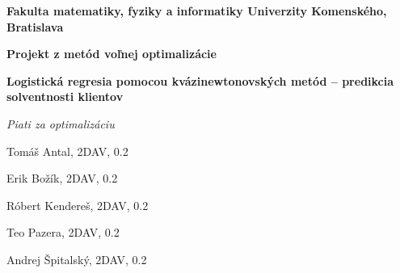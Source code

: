 \documentclass[12pt,oneside,a4paper,slovak]{article}
\begin{document}
	\setcounter{section}{-1}
	\begin{titlepage}
		\large
		
		\begin{center}
			\textbf{Fakulta matematiky, fyziky a informatiky Univerzity Komenského, Bratislava}
			
			\vspace{7.5cm}
			
			\LARGE\textbf{Projekt z metód voľnej optimalizácie}
			
			\vspace{1cm}
			
			\LARGE\textbf{ Logistická regresia pomocou kvázinewtonovských metód -- predikcia solventnosti klientov}
			
			\bigskip 
		\end{center}
			
		\vfill
		
		\hfill
		\begin{minipage}{0.5\textwidth}
			\raggedleft
			
			\textit{Piati za optimalizáciu}
	
			Tomáš Antal, 2DAV, 0.2
			
			Erik Božík, 2DAV, 0.2
			
			Róbert Kendereš, 2DAV, 0.2
			
			Teo Pazera, 2DAV, 0.2
			
			Andrej Špitalský, 2DAV, 0.2
		\end{minipage}
			
	\end{titlepage}
	
	\tableofcontents
	\newpage
	
	
	\newpage
	
	\newpage
	
	\newpage
	
	\newpage
	
	\newpage
	
	\newpage
	
	\newpage
	
	\newpage
	
\end{document}
